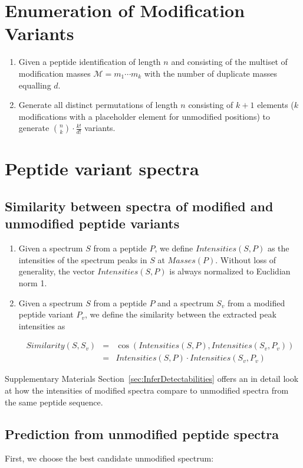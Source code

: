 \documentclass[11pt]{article}
\begin{document}
\section{Enumeration of Modification Variants}
\begin{enumerate}
\item Given a peptide identification of length $n$ and consisting of the multiset of modification masses $\mathcal{M} =m_1 \cdots m_k$ with the number of duplicate masses equalling $d$.
\item  Generate all distinct permutations of length $n$ consisting of $k + 1$ elements ($k$ modifications with a placeholder element for unmodified positions) to generate $\binom{n}{k} \cdot \frac{k!}{d!}$ variants.
\end{enumerate}

\section{Peptide variant spectra}

\subsection{Similarity between spectra of modified and unmodified peptide variants}
\begin{enumerate}
\item Given a spectrum $S$ from a peptide $P$, we define $Intensities(S,P)$ as the intensities of the spectrum peaks in $S$ at $Masses(P)$. Without loss of generality, the vector $Intensities(S,P)$ is always normalized to Euclidian norm 1.
\item Given a spectrum $S$ from a peptide $P$ and a spectrum $S_v$ from a modified peptide variant $P_v$, we define the similarity between the extracted peak intensities as

    \begin{eqnarray*}
    Similarity(S,S_v) & = & \cos(Intensities(S,P),Intensities(S_v,P_v)) \\
                      & = & Intensities(S,P) \cdot Intensities(S_v,P_v)
    \end{eqnarray*}
\end{enumerate}

Supplementary Materials Section~\ref{sec:InferDetectabilities} offers an in detail look at how the intensities of modified spectra compare to unmodified spectra from the same peptide sequence.

\subsection{Prediction from unmodified peptide spectra}
First, we choose the best candidate unmodified spectrum:
\end{document}
